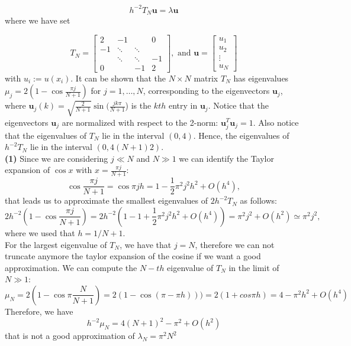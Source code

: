 \documentclass[a4paper,11pt]{article}
\begin{document}
\begin{equation}\label{key}
	h^{-2} T_N \textbf{u} = \lambda \textbf{u}
\end{equation}
where we have set

\begin{equation}\label{key}
	T_N = \begin{bmatrix}
		2 & -1 &  & 0 \\
		-1 & \ddots  & \ddots  &  \\
		& \ddots & \ddots & -1 \\
		0 &  & -1 & 2
	\end{bmatrix}, \text{ and } \textbf{u} = \begin{bmatrix}
	u_1\\
	u_2\\
	\vdots\\
	u_N
\end{bmatrix} 
\end{equation}
with $u_i := u(x_i)$. It can be shown that the $N \times N$ matrix $T_N$ has eigenvalues $\mu_j = 2(1- \cos \frac{\pi j }{N+1})$ for $j = 1, \dots, N$, corresponding to the eigenvectors $\textbf{u}_j$, where $\textbf{u}_j(k) = \sqrt{\frac{2}{N+1}} \sin( \frac{j k \pi}{N+1} $) is the $kth$ entry in $\textbf{u}_j$. Notice that the eigenvectors $\textbf{u}_j$ are normalized with respect to the 2-norm: $\textbf{u}^T_j \textbf{u}_j = 1$. Also notice that the eigenvalues of $T_N$ lie in the interval $(0, 4)$. Hence, the eigenvalues of $h^{-2} T_N$ lie in the interval $(0, 4(N + 1)2 )$.\\


\noindent \textbf{(1)} Since we are considering $j\ll N$ and $N\gg1$ we can identify the Taylor expansion of $\cos x$ with $x = \frac{\pi j }{N+1}$:
\begin{equation}
	\cos \frac{\pi j }{N+1} = \cos \pi j h = 1 - \frac{1}{2} \pi^2 j^2 h^2 + O(h^4),
\end{equation}
that leads us to approximate the smallest eigenvalues of $2h^{-2} T_N$ as follows:
\begin{equation}\label{key}
	2h^{-2} (1- \cos \frac{\pi j }{N+1} ) = 2h^{-2} (1- 1 + \frac{1}{2} \pi^2 j^2 h^2 + O(h^4)) = \pi^2 j^2  + O(h^2) \simeq \pi^2 j^2,
\end{equation}
where we used that $h=1/N+1$.\\
\noindent For the largest eigenvalue of $T_N$, we have that $j = N$, therefore we can not truncate anymore the taylor expansion of the cosine if we want a good approximation. We can compute the $N-th$ eigenvalue of $T_N$ in the limit of $N\gg 1$:
\begin{equation}\label{key}
	\mu_N = 2(1-\cos\pi  \frac{N}{N+1})  =2(1-\cos (\pi -\pi h) )) = 2(1+cos\pi h) = 4 - \pi^2 h^2 + O(h^4)
\end{equation}
Therefore, we have
\begin{equation}\label{key}
	h^{-2} \mu_N = 4(N+1)^2 - \pi^2 + O(h^2)
\end{equation}
that is not a good approximation of $\lambda_N = \pi^2 N^2$ 
\end{document}

